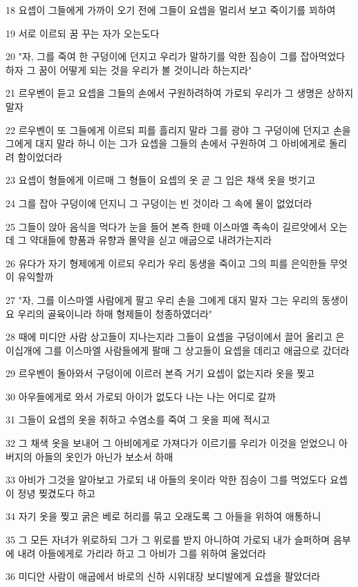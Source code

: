 \par 18 요셉이 그들에게 가까이 오기 전에 그들이 요셉을 멀리서 보고 죽이기를 꾀하여
\par 19 서로 이르되 꿈 꾸는 자가 오는도다
\par 20 "자, 그를 죽여 한 구덩이에 던지고 우리가 말하기를 악한 짐승이 그를 잡아먹었다 하자 그 꿈이 어떻게 되는 것을 우리가 볼 것이니라 하는지라"
\par 21 르우벤이 듣고 요셉을 그들의 손에서 구원하려하여 가로되 우리가 그 생명은 상하지 말자
\par 22 르우벤이 또 그들에게 이르되 피를 흘리지 말라 그를 광야 그 구덩이에 던지고 손을 그에게 대지 말라 하니 이는 그가 요셉을 그들의 손에서 구원하여 그 아비에게로 돌리려 함이었더라
\par 23 요셉이 형들에게 이르매 그 형들이 요셉의 옷 곧 그 입은 채색 옷을 벗기고
\par 24 그를 잡아 구덩이에 던지니 그 구덩이는 빈 것이라 그 속에 물이 없었더라
\par 25 그들이 앉아 음식을 먹다가 눈을 들어 본즉 한떼 이스마엘 족속이 길르앗에서 오는데 그 약대들에 향품과 유향과 몰약을 싣고 애굽으로 내려가는지라
\par 26 유다가 자기 형제에게 이르되 우리가 우리 동생을 죽이고 그의 피를 은익한들 무엇이 유익할까
\par 27 "자, 그를 이스마엘 사람에게 팔고 우리 손을 그에게 대지 말자 그는 우리의 동생이요 우리의 골육이니라 하매 형제들이 청종하였더라"
\par 28 때에 미디안 사람 상고들이 지나는지라 그들이 요셉을 구덩이에서 끌어 올리고 은 이십개에 그를 이스마엘 사람들에게 팔매 그 상고들이 요셉을 데리고 애굽으로 갔더라
\par 29 르우벤이 돌아와서 구덩이에 이르러 본즉 거기 요셉이 없는지라 옷을 찢고
\par 30 아우들에게로 와서 가로되 아이가 없도다 나는 나는 어디로 갈까
\par 31 그들이 요셉의 옷을 취하고 수염소를 죽여 그 옷을 피에 적시고
\par 32 그 채색 옷을 보내어 그 아비에게로 가져다가 이르기를 우리가 이것을 얻었으니 아버지의 아들의 옷인가 아닌가 보소서 하매
\par 33 아비가 그것을 알아보고 가로되 내 아들의 옷이라 악한 짐승이 그를 먹었도다 요셉이 정녕 찢겼도다 하고
\par 34 자기 옷을 찢고 굵은 베로 허리를 묶고 오래도록 그 아들을 위하여 애통하니
\par 35 그 모든 자녀가 위로하되 그가 그 위로를 받지 아니하여 가로되 내가 슬퍼하며 음부에 내려 아들에게로 가리라 하고 그 아비가 그를 위하여 울었더라
\par 36 미디안 사람이 애굽에서 바로의 신하 시위대장 보디발에게 요셉을 팔았더라

